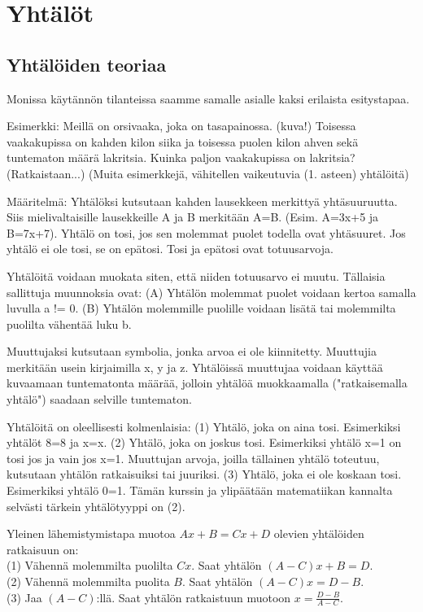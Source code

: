 %
\part{Yhtälöt}
\chapter{Yhtälöiden teoriaa}
Monissa käytännön tilanteissa saamme samalle asialle kaksi erilaista esitystapaa.

Esimerkki: Meillä on orsivaaka, joka on tasapainossa. (kuva!) Toisessa vaakakupissa on kahden kilon siika ja toisessa puolen kilon ahven sekä tuntematon määrä lakritsia. Kuinka paljon vaakakupissa on lakritsia? (Ratkaistaan...) (Muita esimerkkejä, vähitellen vaikeutuvia (1. asteen) yhtälöitä)

Määritelmä: Yhtälöksi kutsutaan kahden lausekkeen merkittyä yhtäsuuruutta. Siis mielivaltaisille lausekkeille A ja B merkitään A=B. (Esim. A=3x+5 ja B=7x+7). Yhtälö on tosi, jos sen molemmat puolet todella ovat yhtäsuuret. Jos yhtälö ei ole tosi, se on epätosi. Tosi ja epätosi ovat totuusarvoja.

Yhtälöitä voidaan muokata siten, että niiden totuusarvo ei muutu. Tällaisia sallittuja muunnoksia ovat:
(A) Yhtälön molemmat puolet voidaan kertoa samalla luvulla a != 0.
(B) Yhtälön molemmille puolille voidaan lisätä tai molemmilta puolilta vähentää luku b.

Muuttujaksi kutsutaan symbolia, jonka arvoa ei ole kiinnitetty. Muuttujia merkitään usein kirjaimilla x, y ja z. Yhtälöissä muuttujaa voidaan käyttää kuvaamaan tuntematonta määrää, jolloin yhtälöä muokkaamalla ("ratkaisemalla yhtälö") saadaan selville tuntematon.

Yhtälöitä on oleellisesti kolmenlaisia:
(1) Yhtälö, joka on aina tosi. Esimerkiksi yhtälöt 8=8 ja x=x.
(2) Yhtälö, joka on joskus tosi. Esimerkiksi yhtälö x=1 on tosi jos ja vain jos x=1. Muuttujan arvoja, joilla tällainen yhtälö toteutuu, kutsutaan yhtälön ratkaisuiksi tai juuriksi.
(3) Yhtälö, joka ei ole koskaan tosi. Esimerkiksi yhtälö 0=1.
Tämän kurssin ja ylipäätään matematiikan kannalta selvästi tärkein yhtälötyyppi on (2).

\begin{theorem}
Yleinen lähemistymistapa muotoa $Ax+B = Cx+D$ olevien yhtälöiden ratkaisuun on: \\
(1) Vähennä molemmilta puolilta $Cx$. Saat yhtälön $(A-C)x + B = D$. \\
(2) Vähennä molemmilta puolita $B$. Saat yhtälön $(A-C)x = D-B$. \\
(3) Jaa $(A-C)$:llä. Saat yhtälön ratkaistuun muotoon $x = \frac{D-B}{A-C}$.
\end{theorem}

